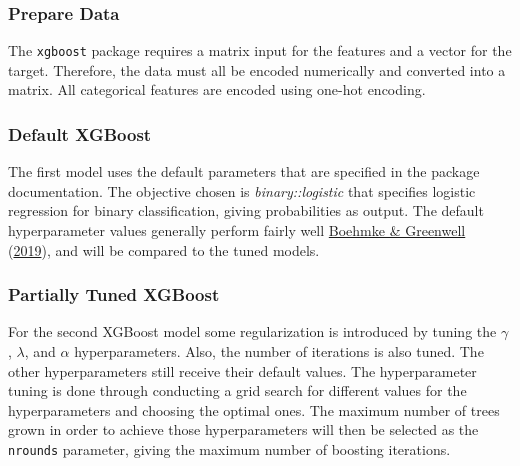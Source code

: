 \documentclass[11pt,preprint, authoryear]{elsarticle}
\numberwithin{equation}{section}
\numberwithin{figure}{section}
\numberwithin{table}{section}
\begin{document}
\hypertarget{prepare-data}{%
\subsubsection{Prepare Data}\label{prepare-data}}

The \texttt{xgboost} package requires a matrix input for the features
and a vector for the target. Therefore, the data must all be encoded
numerically and converted into a matrix. All categorical features are
encoded using one-hot encoding.

\hypertarget{default-xgboost}{%
\subsubsection{Default XGBoost}\label{default-xgboost}}

The first model uses the default parameters that are specified in the
package documentation. The objective chosen is \emph{binary::logistic}
that specifies logistic regression for binary classification, giving
probabilities as output. The default hyperparameter values generally
perform fairly well \protect\hyperlink{ref-Boehmke}{Boehmke \&
Greenwell} (\protect\hyperlink{ref-Boehmke}{2019}), and will be compared
to the tuned models.

\hypertarget{partially-tuned-xgboost}{%
\subsubsection{Partially Tuned XGBoost}\label{partially-tuned-xgboost}}

For the second XGBoost model some regularization is introduced by tuning
the \(\gamma\), \(\lambda\), and \(\alpha\) hyperparameters. Also, the
number of iterations is also tuned. The other hyperparameters still
receive their default values. The hyperparameter tuning is done through
conducting a grid search for different values for the hyperparameters
and choosing the optimal ones. The maximum number of trees grown in
order to achieve those hyperparameters will then be selected as the
\texttt{nrounds} parameter, giving the maximum number of boosting
iterations.
\end{document}
